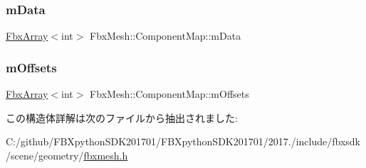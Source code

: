 \subsubsection{\texorpdfstring{m\+Data}{mData}}
{\footnotesize\ttfamily \hyperlink{class_fbx_array}{Fbx\+Array}$<$int$>$ Fbx\+Mesh\+::\+Component\+Map\+::m\+Data}

\mbox{\label{struct_fbx_mesh_1_1_component_map_a1228c1a961435c616f98d14a7d853414}} 
\subsubsection{\texorpdfstring{m\+Offsets}{mOffsets}}
{\footnotesize\ttfamily \hyperlink{class_fbx_array}{Fbx\+Array}$<$int$>$ Fbx\+Mesh\+::\+Component\+Map\+::m\+Offsets}



この構造体詳解は次のファイルから抽出されました\+:\begin{DoxyCompactItemize}
\item 
C\+:/github/\+F\+B\+Xpython\+S\+D\+K201701/\+F\+B\+Xpython\+S\+D\+K201701/2017./include/fbxsdk/scene/geometry/\hyperlink{fbxmesh_8h}{fbxmesh.\+h}\end{DoxyCompactItemize}
